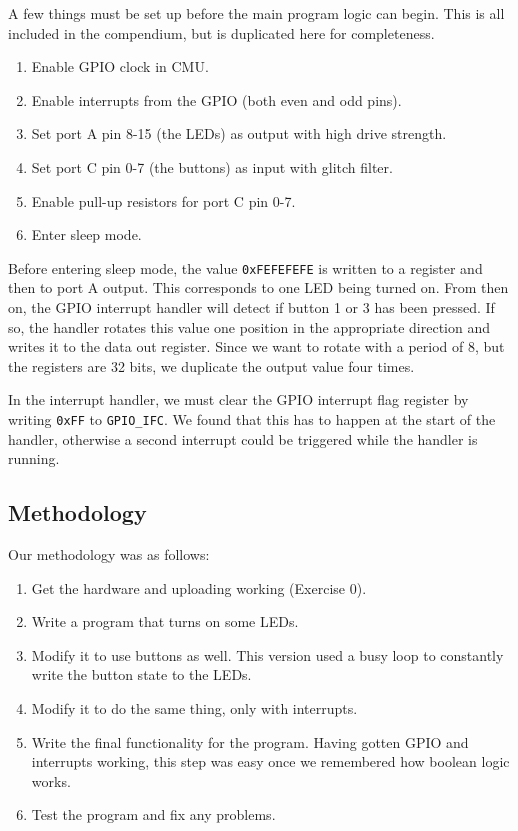 \documentclass[a4paper, 12pt]{article}
\begin{document}
        A few things must be set up before the main program logic can begin. This is all included in the compendium, but is duplicated here for completeness.

        \begin{enumerate}
            \item Enable GPIO clock in CMU.
            \item Enable interrupts from the GPIO (both even and odd pins).
            \item Set port A pin 8-15 (the LEDs) as output with high drive strength.
            \item Set port C pin 0-7 (the buttons) as input with glitch filter.
            \item Enable pull-up resistors for port C pin 0-7.
            \item Enter sleep mode.
        \end{enumerate}

        Before entering sleep mode, the value \texttt{0xFEFEFEFE} is written to a register and then to port A output. This corresponds to one LED being turned on. From then on, the GPIO interrupt handler will detect if button 1 or 3 has been pressed. If so, the handler rotates this value one position in the appropriate direction and writes it to the data out register. Since we want to rotate with a period of 8, but the registers are 32 bits, we duplicate the output value four times.

        In the interrupt handler, we must clear the GPIO interrupt flag register by writing \texttt{0xFF} to \texttt{GPIO\_IFC}. We found that this has to happen at the start of the handler, otherwise a second interrupt could be triggered while the handler is running.

    \subsection{Methodology} %
    \label{sub:methodology}
        Our methodology was as follows:
        \begin{enumerate}
            \item Get the hardware and uploading working (Exercise 0).
            \item Write a program that turns on some LEDs.
            \item Modify it to use buttons as well. This version used a busy loop to constantly write the button state to the LEDs.
            \item Modify it to do the same thing, only with interrupts.
            \item Write the final functionality for the program. Having gotten GPIO and interrupts working, this step was easy once we remembered how boolean logic works.
            \item Test the program and fix any problems.
        \end{enumerate}
\end{document}

